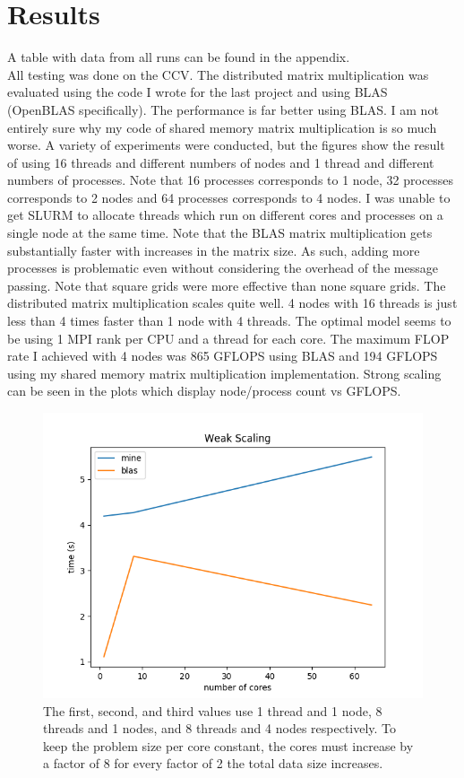 \documentclass{article}
\begin{document}
\section{Results}

A table with data from all runs can be found in the appendix. \\

All testing was done on the CCV. The distributed matrix multiplication was evaluated using the code 
I wrote for the last project and
using BLAS (OpenBLAS specifically). The performance is far better using BLAS. I am not entirely sure why
my code of shared memory matrix multiplication is so much worse. A variety of experiments were conducted,
but the figures show the result of using 16 threads and different numbers of nodes and 1 thread and
different numbers of processes. Note that 16 processes corresponds to 1 node, 32 processes corresponds to 2
nodes and 64 processes corresponds to 4 nodes. I was unable to get SLURM to allocate threads which run on
different cores and processes on a single node at the same time. Note that the BLAS matrix multiplication
gets substantially faster with increases in the matrix size. As such, adding more processes is problematic
even without considering the overhead of the message passing. Note that square grids were 
more effective than none square grids. The distributed matrix multiplication scales quite well. 4 nodes with
16 threads is just less than 4 times faster than 1 node with 4 threads. The optimal model seems to be
using 1 MPI rank per CPU and a thread for each core. The maximum FLOP rate I achieved with 4 nodes was
865 GFLOPS using BLAS and 194 GFLOPS using my shared memory matrix multiplication implementation.
Strong scaling can be seen in the plots which display node/process count vs GFLOPS.

\begin{figure}[h!]
    \centering
    \includegraphics[width=0.8\linewidth]{weak_scaling.png}
    \caption{The first, second, and third values use 1 thread and 1 node, 8 threads and 1 nodes, 
        and 8 threads and 4 nodes respectively. To keep the problem size per core constant, the
    cores must increase by a factor of 8 for every factor of 2 the total data size increases.}
\end{figure}
\end{document}
